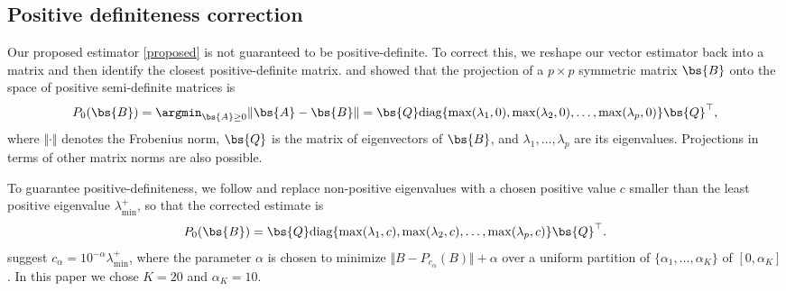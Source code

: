 \subsection{\label{posdef}Positive definiteness correction}
Our proposed estimator \eqref{proposed} is not guaranteed to be positive-definite. To correct this, we reshape our vector estimator back into a matrix and then identify the closest positive-definite matrix. \citet{higham1988computing} and \citet{huang2017calibration} showed that the projection of a $p \times p$ symmetric matrix $\bs{B}$ onto the space of positive semi-definite matrices is
\[
P_0(\bs{B})
=
\argmin_{\bs{A}\geq 0} \Vert\bs{A}-\bs{B}\Vert
=
\bs{Q}\text{diag}\{\max(\lambda_1,0),\max(\lambda_2,0),\ldots,\max(\lambda_p,0)\}\bs{Q}^\top,
\]
where $\Vert \cdot \Vert$ denotes the Frobenius norm, $\bs{Q}$ is the matrix of eigenvectors of $\bs{B}$, and $\lambda_1,\ldots,\lambda_p$ are its eigenvalues. Projections in terms of other matrix norms are also possible.

To guarantee positive-definiteness, we follow \citet{huang2017calibration} and replace non-positive eigenvalues with a chosen positive value $c$ smaller than the least positive eigenvalue $\lambda_{\min}^+$, so that the corrected estimate is
\begin{equation}
  \label{near posdef}
  P_0(\bs{B})
  =
  \bs{Q}\text{diag}\{\max(\lambda_1,c),\max(\lambda_2,c),\ldots,\max(\lambda_p,c)\}\bs{Q}^\top.
\end{equation}
\citet{huang2017calibration} suggest $c_{\alpha}=10^{-\alpha}\lambda_{\min}^+$, where the parameter $\alpha$ is chosen to minimize $\Vert B - P_{c_{\alpha}}(B) \Vert + \alpha$ over a uniform partition of $\{\alpha_1,\ldots,\alpha_K\}$ of $[0,\alpha_K]$. In this paper we chose $K=20$ and $\alpha_K=10$.

